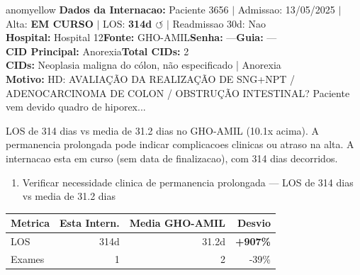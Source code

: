 \documentclass[a4paper,10pt]{article}
\begin{document}
\begin{anomalycard}[Internacao 3730 | GHO-AMIL | MODERADO (z=2.54)]{anomyellow}
\textbf{Dados da Internacao:} Paciente 3656 $\mid$ Admissao: 13/05/2025 $\mid$ Alta: \textcolor{anomorange}{\textbf{EM CURSO}} $\mid$ LOS: \textbf{314d \textcolor{anomorange}{$\circlearrowleft$}} $\mid$ Readmissao 30d: Nao\\
\textbf{Hospital:} Hospital 12\quad\textbf{Fonte:} GHO-AMIL\quad\textbf{Senha:} ---\quad\textbf{Guia:} ---\\
\textbf{CID Principal:} {\small Anorexia}\quad\textbf{Total CIDs:} 2\\

\textbf{CIDs:} {\scriptsize Neoplasia maligna do cólon, não especificado | Anorexia}\\

\textbf{Motivo:} {\scriptsize HD: AVALIAÇÃO DA REALIZAÇÃO DE SNG+NPT / ADENOCARCINOMA DE COLON / OBSTRUÇÃO INTESTINAL?   Paciente vem devido quadro de hiporex...}\\

\vspace{2pt}\begin{tcolorbox}[colback=severityred!20,colframe=anomyellow,title={\textbf{Interpretacao de Negocio}},fonttitle=\bfseries\small,left=4pt,right=4pt,top=3pt,bottom=3pt]
{\small LOS de 314 dias vs media de 31.2 dias no GHO-AMIL (10.1x acima). A permanencia prolongada pode indicar complicacoes clinicas ou atraso na alta. A internacao esta em curso (sem data de finalizacao), com 314 dias decorridos.}
\end{tcolorbox}
\begin{tcolorbox}[colback=severityyellow!30,colframe=anomorange,title={\textbf{Recomendacoes Especificas}},fonttitle=\bfseries\small,left=4pt,right=4pt,top=3pt,bottom=3pt]
\begin{enumerate}[nosep,leftmargin=16pt]
\item {\small Verificar necessidade clinica de permanencia prolongada --- LOS de 314 dias vs media de 31.2 dias}
\end{enumerate}
\end{tcolorbox}
\begin{center}\begin{tabular}{l r r r}\toprule\textbf{Metrica} & \textbf{Esta Intern.} & \textbf{Media GHO-AMIL} & \textbf{Desvio} \\\midrule
LOS & 314d & 31.2d & \textcolor{anomred}{\textbf{+907\%}} \\
Exames & 1 & 2 & -39\% \\
\bottomrule\end{tabular}\end{center}


\end{anomalycard}
\end{document}
